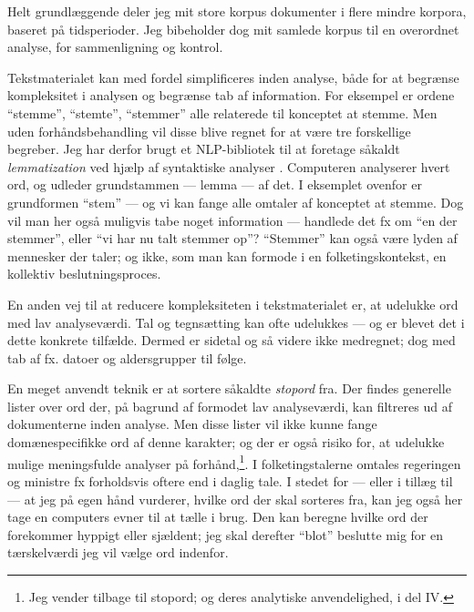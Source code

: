 Helt grundlæggende deler jeg mit store korpus dokumenter i flere mindre korpora, baseret på tidsperioder.
Jeg bibeholder dog mit samlede korpus til en overordnet analyse, for sammenligning og kontrol.

Tekstmaterialet kan med fordel simplificeres inden analyse, både for at begrænse kompleksitet i analysen og begrænse tab af information.
For eksempel er ordene “stemme”, “stemte”, “stemmer” alle relaterede til konceptet at stemme.
Men uden forhåndsbehandling vil disse blive regnet for at være tre forskellige begreber.
Jeg har derfor brugt et NLP-bibliotek \autocite{strakaUDPipeUFAL2020} til at foretage såkaldt \textit{lemmatization} ved hjælp af syntaktiske analyser \autocite[s. 28]{kwartlerTextMiningPractice2017}.
Computeren analyserer hvert ord, og udleder grundstammen --- lemma — af det. I eksemplet ovenfor er grundformen “stem” — og vi kan fange alle omtaler af konceptet at stemme.
Dog vil man her også muligvis tabe noget information — handlede det fx om “en der stemmer”, eller “vi har nu talt stemmer op”?
“Stemmer” kan også være lyden af mennesker der taler; og ikke, som man kan formode i en folketingskontekst, en kollektiv beslutningsproces.

En anden vej til at reducere kompleksiteten i tekstmaterialet er, at udelukke ord med lav analyseværdi.
Tal og tegnsætting kan ofte udelukkes — og er blevet det i dette konkrete tilfælde.
Dermed er sidetal og så videre ikke medregnet; dog med tab af fx. datoer og aldersgrupper til følge.

En meget anvendt teknik er at sortere såkaldte \textit{stopord} fra.
Der findes generelle lister over ord der, på bagrund af formodet lav analyseværdi, kan filtreres ud af dokumenterne inden analyse.
Men disse lister vil ikke kunne fange domænespecifikke ord af denne karakter; og der er også risiko for, at udelukke mulige meningsfulde analyser på forhånd,\autocite[s. 27]{manningIntroductionInformationRetrieval2008}\footnote{Jeg vender tilbage til stopord;
og deres analytiske anvendelighed, i del IV.}.
I folketingstalerne omtales regeringen og ministre fx forholdsvis oftere end i daglig tale.
I stedet for — eller i tillæg til — at jeg på egen hånd vurderer, hvilke ord der skal sorteres fra, kan jeg også her tage en computers evner til at tælle i brug.
Den kan beregne hvilke ord der forekommer hyppigt eller sjældent; jeg skal derefter “blot” beslutte mig for en tærskelværdi jeg vil vælge ord indenfor.

